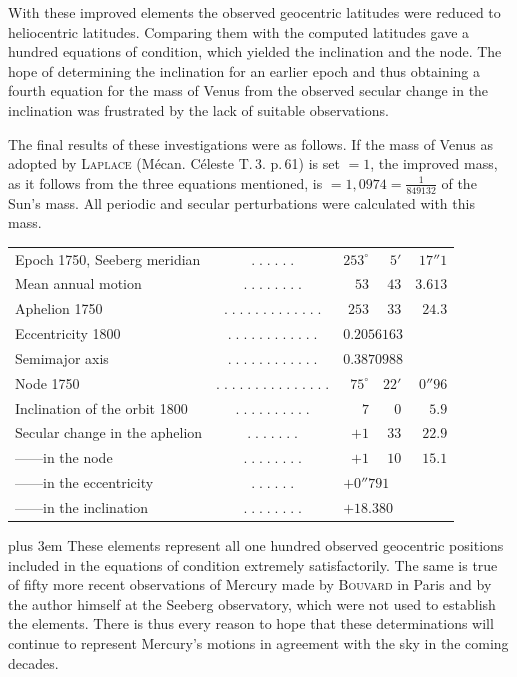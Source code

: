 With these improved elements the observed geocentric latitudes were reduced to heliocentric latitudes. Comparing them with the computed latitudes gave a hundred equations of condition, which yielded the inclination and the node. The hope of determining the inclination for an earlier epoch and thus obtaining a fourth equation for the mass of Venus from the observed secular change in the inclination was frustrated by the lack of suitable observations.

The final results of these investigations were as follows.
If the mass of Venus as adopted by \textsc{Laplace} (Mécan. Céleste T.\,3. p.\,61) is set $= 1$, the improved mass, as it follows from the three equations mentioned, is $= 1{,}0974 = \frac{1}{849132}$ of the Sun's mass. All periodic and secular perturbations were calculated with this mass.

\begin{center}\fontsize{9}{11}\selectfont\setlength{\tabcolsep}{2pt}\renewcommand{\arraystretch}{1.18}\begin{tabular}{@{}l c r@{\;}r@{\;}r@{}}
Epoch 1750, Seeberg meridian & $.\;.\;.\;.\;.\;.$ & $253^\circ$ & $5'$ & $17''1$\\
Mean annual motion & $.\;.\;.\;.\;.\;.\;.\;.$ & $53$ & $43$ & $3.613$\\
Aphelion 1750 & $.\;.\;.\;.\;.\;.\;.\;.\;.\;.\;.\;.\;.$ & $253$ & $33$ & $24.3$\\
Eccentricity 1800 & $.\;.\;.\;.\;.\;.\;.\;.\;.\;.\;.\;.$ & \multicolumn{3}{l}{$0.2056163$}\\
Semimajor axis & $.\;.\;.\;.\;.\;.\;.\;.\;.\;.\;.\;.$ & \multicolumn{3}{l}{$0.3870988$}\\
Node 1750 & $.\;.\;.\;.\;.\;.\;.\;.\;.\;.\;.\;.\;.\;.\;.$ & $75^\circ$ & $22'$ & $0''96$\\
Inclination of the orbit 1800 & $.\;.\;.\;.\;.\;.\;.\;.\;.\;.$ & $7$ & $0$ & $5.9$\\
Secular change in the aphelion & $.\;.\;.\;.\;.\;.\;.$ & $+1$ & $33$ & $22.9$\\
\quad —\quad —\quad in the node & $.\;.\;.\;.\;.\;.\;.\;.$ & $+1$ & $10$ & $15.1$\\
\quad —\quad —\quad in the eccentricity & $.\;.\;.\;.\;.\;.$ & \multicolumn{3}{l}{$+0''791$}\\
\quad —\quad —\quad in the inclination & $.\;.\;.\;.\;.\;.\;.\;.$ & \multicolumn{3}{l}{$+18.380$}\\
\end{tabular}\end{center}

{\rightskip=0pt plus 3em These elements represent all one hundred observed geocentric positions included in the equations of condition extremely satisfactorily. The same is true of fifty more recent observations of Mercury made by \textsc{Bouvard} in Paris and by the author himself at the Seeberg observatory, which were not used to establish the elements. There is thus every reason to hope that these determinations will continue to represent Mercury's motions in agreement with the sky in the coming decades.\par}
